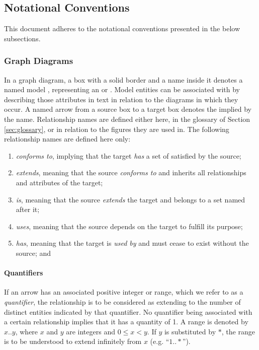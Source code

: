\newpage

\subsection{Notational Conventions}
\label{sec:introduction:conventions}

This document adheres to the notational conventions presented in the below subsections.

\subsubsection{Graph Diagrams}
\label{sec:introduction:conventions:graphs}

In a graph diagram, a box with a solid border and a name inside it denotes a named model , representing an  or .
Model entities can be associated with  by describing those attributes in text in relation to the diagrams in which they occur.
A named arrow from a source box to a target box denotes the  implied by the name.
Relationship names are defined either here, in the glossary of Section \ref{sec:glossary}, or in relation to the figures they are used in.
The following relationship names are defined here only:

\begin{enumerate}
\item \textit{conforms to}, implying that the target \textit{has} a set of  satisfied by the source;
\item \textit{extends}, meaning that the source \textit{conforms to} and inherits all relationships and attributes of the target;
\item \textit{is}, meaning that the source \textit{extends} the target and belongs to a set named after it;
\item \textit{uses}, meaning that the source depends on the target to fulfill its purpose;
\item \textit{has}, meaning that the target is \textit{used by} and must cease to exist without the source; and
\end{enumerate}

\paragraph{Quantifiers}
If an arrow has an associated positive integer or range, which we refer to as a \textit{quantifier}, the relationship is to be considered as extending to the number of distinct entities indicated by that quantifier.
No quantifier being associated with a certain relationship implies that it has a quantity of 1.
A range is denoted by $x..y$, where $x$ and $y$ are integers and $0 \leq x < y$.
If $y$ is substituted by $*$, the range is to be understood to extend infinitely from $x$ (e.g. ``$1..*$'').

